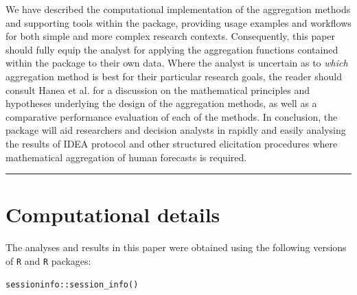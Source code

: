 \documentclass[article]{jss}
\begin{document}
We have described the computational implementation of the aggregation
methods and supporting tools within the  package,
providing usage examples and workflows for both simple and more complex
research contexts. Consequently, this paper should fully equip the
analyst for applying the aggregation functions contained within the
 package to their own data. Where the analyst is uncertain
as to \emph{which} aggregation method is best for their particular
research goals, the reader should consult Hanea et al.
\citeyearpar{Hanea2021} for a discussion on the mathematical principles
and hypotheses underlying the design of the aggregation methods, as well
as a comparative performance evaluation of each of the methods. In
conclusion, the  package will aid researchers and decision
analysts in rapidly and easily analysing the results of IDEA protocol
and other structured elicitation procedures where mathematical
aggregation of human forecasts is required.

\begin{center}\rule{0.5\linewidth}{0.5pt}\end{center}

\hypertarget{computational-details}{%
\section*{Computational details}\label{computational-details}}

The analyses and results in this paper were obtained using the following
versions of \texttt{R} and \texttt{R} packages:

\begin{verbatim}
sessioninfo::session_info()
\end{verbatim}
\end{document}
